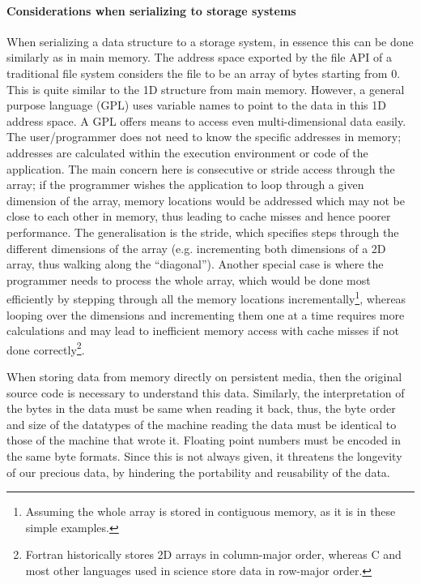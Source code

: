 \paragraph{Considerations when serializing to storage systems}


When serializing a data structure to a storage system, in essence this can be done similarly as in main memory.
The address space exported by the file API of a traditional file system considers the file to be an array of bytes starting from 0.
This is quite similar to the 1D structure from main memory.
However, a general purpose language (GPL) uses variable names to point to the data in this 1D address space.
A GPL offers means to access even multi-dimensional data easily.
The user/programmer does not need to know the specific addresses in memory; addresses are calculated within the execution environment or code of the application.
The main concern here is consecutive or stride access through the array; if the programmer wishes the application to loop through a given dimension of the array, memory locations would be addressed which may not be close to each other in memory, thus leading to cache misses and hence poorer performance.
The generalisation is the stride, which specifies steps through the different dimensions of the array (e.g. incrementing both dimensions of a 2D array, thus walking along the ``diagonal'').
Another special case is where the programmer needs to process the whole array, which would be done most efficiently by stepping through all the memory locations incrementally\footnote{Assuming the whole array is stored in contiguous memory, as it is in these simple examples.},
whereas looping over the dimensions and incrementing them one at a time requires more calculations and may lead to inefficient memory access with cache misses if not done correctly\footnote{Fortran historically stores 2D arrays in column-major order, whereas C and most other languages used in science store data in row-major order.}.


\medskip

When storing data from memory directly on persistent media, then the original source code is necessary to understand this data.
Similarly, the interpretation of the bytes in the data must be same when reading it back, thus, the byte order and size of the datatypes of the machine reading the data must be identical to those of the machine that wrote it.  Floating point numbers must be encoded in the same byte formats.
Since this is not always given, it threatens the longevity of our precious data, by hindering the portability and reusability of the data.

